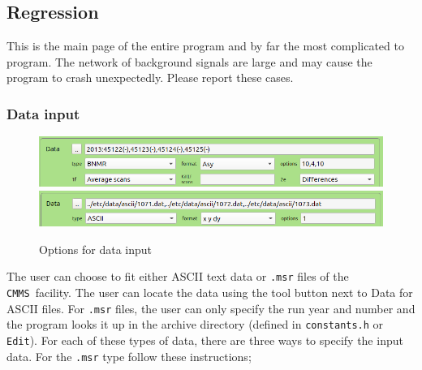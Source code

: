 \documentclass[10pt,letterpaper,oneside]{article}
\newcommand{\cmms}{\texttt{CMMS}}
\begin{document}
\clearpage
\subsection{Regression}
This is the main page of the entire program and by far the most complicated to program. The network of background signals are large and may cause the program to crash unexpectedly. Please report these cases.  

\subsubsection{Data input}
\begin{figure}[h]
\includegraphics[width=\textwidth]{analyze-bnmr.png}
\includegraphics[width=\textwidth]{analyze-ascii.png}
 \caption{Options for data input}
 \label{fig-mag}
 \end{figure}
The user can choose to fit either ASCII text data or \verb+.msr+ files of the \cmms\ facility. The user can locate the data using the tool button next to Data for ASCII files. For \verb+.msr+ files, the user can only specify the run year and number and the program looks it up in the archive directory (defined in \verb+constants.h+ or \verb+Edit+).
For each of these types of data, there are three ways to specify the input data.  For the \verb+.msr+ type follow these instructions;
\end{document}
